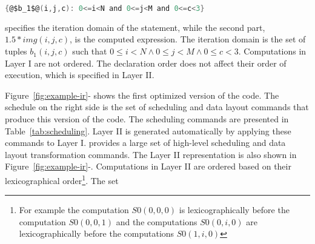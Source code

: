 \begin{lstlisting}[language=C,escapechar=@,numbers=none]
        {@$b_1$@(i,j,c): 0<=i<N and 0<=j<M and 0<=c<3}
\end{lstlisting}

\noindent specifies the iteration domain of the statement, while the second part, $1.5*img(i, j, c)$, is the computed expression.
The iteration domain is the set of tuples $b_1(i,j,c)$ such that $0\leq i < N \wedge 0\leq j < M \wedge 0\leq c < 3$.
Computations in Layer I are not ordered.  The declaration order does not affect their order of execution, which is specified in Layer II.  





Figure~\ref{fig:example-ir}-\codetwo{} shows the first optimized version of the code.  The schedule on the right side is the set of scheduling and data layout commands that produce this version of the code.  The scheduling commands are presented in Table~\ref{tab:scheduling}.  Layer II is generated automatically by applying these commands to Layer I.
\framework provides a large set of high-level scheduling and data layout transformation commands. %
The Layer II representation is also shown in Figure~\ref{fig:example-ir}-\codetwo{}.
Computations in Layer II are ordered based on their lexicographical order\footnote{For example the computation $S0(0, 0, 0)$ is lexicographically before the computation \mbox{$S0(0, 0, 1)$} and the computations $S0(0, i, 0)$ are lexicographically before the computations $S0(1, i, 0)$}.  The set

